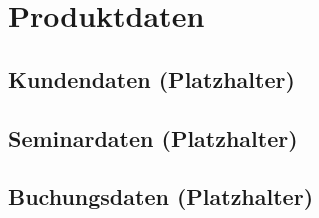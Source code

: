 \section{Produktdaten}

\subsection{Kundendaten (Platzhalter)}

\subsection{Seminardaten (Platzhalter)}

\subsection{Buchungsdaten (Platzhalter)}